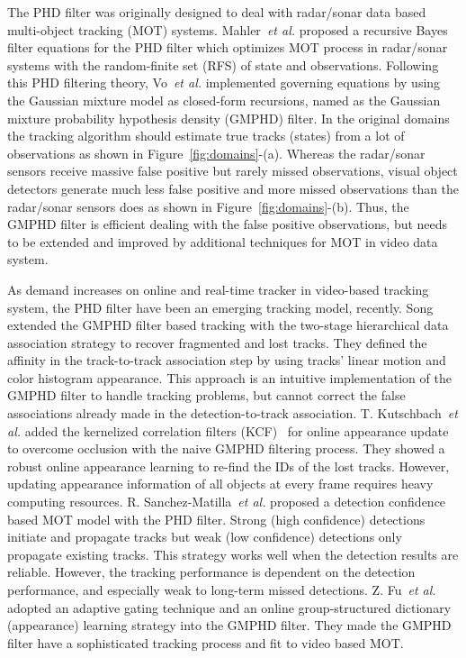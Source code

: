 \documentclass[journal]{IEEEtran}
\newcounter{ct}
\begin{document}
The PHD filter\cite{mahler,gmphd,smcphd} was originally designed to deal with radar/sonar data based multi-object tracking (MOT) systems. Mahler~\textit{et al.}\cite{mahler} proposed a recursive Bayes filter equations for the PHD filter which optimizes MOT process in radar/sonar systems with the random-finite set (RFS) of state and observations. Following this PHD filtering theory, Vo~\textit{et al.}\cite{gmphd} implemented governing equations by using the Gaussian mixture model as closed-form recursions, named as the Gaussian mixture probability hypothesis density (GMPHD) filter.
In the original domains the tracking algorithm should estimate true tracks (states) from a lot of observations as shown in Figure~\ref{fig:domains}-(a). Whereas the radar/sonar sensors receive massive false positive but rarely missed observations, visual object detectors generate much less false positive and more missed observations than the radar/sonar sensors does as shown in Figure~\ref{fig:domains}-(b). Thus, the GMPHD filter is efficient dealing with the false positive observations, but needs to be extended and improved by additional techniques for MOT in video data system.

As demand increases on online and real-time tracker in video-based tracking system, the PHD filter have been an emerging tracking model, recently.
Song~\cite{prev1} extended the GMPHD filter based tracking with the two-stage hierarchical data association strategy to recover fragmented and lost tracks. They defined the affinity in the track-to-track association step by using tracks' linear motion and color histogram appearance. This approach is an intuitive implementation of the GMPHD filter to handle tracking problems, but cannot correct the false associations already made in the detection-to-track association.
T. Kutschbach~\textit{et al.}\cite{gmphdkcf} added the kernelized correlation filters (KCF)~\cite{kcf} for online appearance update to overcome occlusion with the naive GMPHD filtering process. They showed a robust online appearance learning to re-find the IDs of the lost tracks. However, updating appearance information of all objects at every frame requires heavy computing resources.
R. Sanchez-Matilla~\textit{et al.}\cite{eamtt} proposed a detection confidence based MOT model with the PHD filter. Strong (high confidence) detections initiate and propagate tracks but weak (low confidence) detections only propagate existing tracks. This strategy works well when the detection results are reliable. However, the tracking performance is dependent on the detection performance, and especially weak to long-term missed detections.
Z. Fu~\textit{et al.}\cite{fu1} adopted an adaptive gating technique and an online group-structured dictionary (appearance) learning strategy into the GMPHD filter. They made the GMPHD filter have a sophisticated tracking process and fit to video based MOT.
\end{document}
